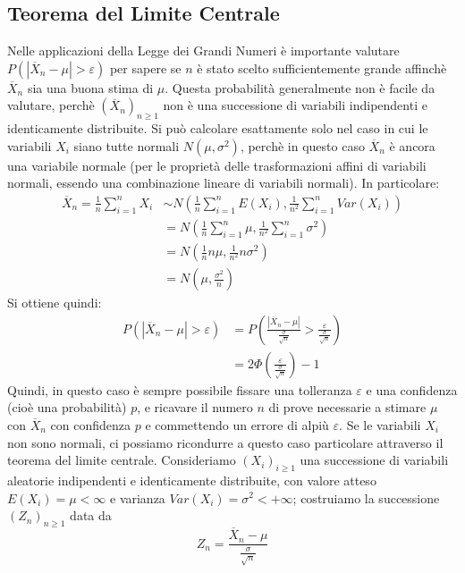 \documentclass{article}
\theoremstyle{plain}
\theoremstyle{definition}
\theoremstyle{remark}
\begin{document}
\subsection{Teorema del Limite Centrale} %
\label{sub:teorema_del_limite_centrale}
Nelle applicazioni della Legge dei Grandi Numeri è importante valutare $P(|\overline{X}_n-\mu|>\varepsilon)$ per sapere se $n$ è stato scelto sufficientemente grande affinchè $\overline{X}_n$ sia una buona stima di $\mu$. Questa probabilità generalmente non è facile da valutare, perchè $(\overline{X}_n)_{n\geq1}$ non è una successione di variabili indipendenti e identicamente distribuite. Si può calcolare esattamente solo nel caso in cui le variabili $X_i$ siano tutte normali $N(\mu,\sigma^2)$, perchè in questo caso $\overline{X}_n$ è ancora una variabile normale (per le proprietà delle trasformazioni affini di variabili normali, essendo una combinazione lineare di variabili normali). In particolare:
\begin{align*}
	\overline{X}_n=\frac{1}{n}\sum_{i=1}^nX_i&\sim N\left(\frac{1}{n}\sum_{i=1}^nE(X_i),\frac{1}{n^2}\sum_{i=1}^nVar(X_i)\right)\\
	&=N\left(\frac{1}{n}\sum_{i=1}^n\mu,\frac{1}{n^2}\sum_{i=1}^n\sigma^2\right)\\
	&=N\left(\frac{1}{n}n\mu,\frac{1}{n^2}n\sigma^2\right)\\
	&=N\left(\mu,\frac{\sigma^2}{n}\right)
\end{align*}
Si ottiene quindi:
\begin{align*}
	P(|\overline{X}_n-\mu|>\varepsilon)&=P\left(\frac{|\overline{X}_n-\mu|}{\frac{\sigma}{\sqrt{n}}}>\frac{\varepsilon}{\frac{\sigma}{\sqrt{n}}}\right)\\
	&=2\Phi\left(\frac{\varepsilon}{\frac{\sigma}{\sqrt{n}}}\right)-1
\end{align*}
Quindi, in questo caso è sempre possibile fissare una tolleranza $\varepsilon$ e una confidenza (cioè una probabilità) $p$, e ricavare il numero $n$ di prove necessarie a stimare $\mu$ con $\overline{X}_n$ con confidenza $p$ e commettendo un errore di alpiù $\varepsilon$. Se le variabili $X_i$ non sono normali, ci possiamo ricondurre a questo caso particolare attraverso il teorema del limite centrale. Consideriamo $(X_i)_{i\geq1}$ una successione di variabili aleatorie indipendenti e identicamente distribuite, con valore atteso $E(X_i)=\mu<\infty$ e varianza $Var(X_i)=\sigma^2<+\infty$; costruiamo la successione $(Z_n)_{n\geq1}$ data da
\begin{equation*}
	Z_n=\frac{\overline{X}_n-\mu}{\frac{\sigma}{\sqrt{n}}}
\end{equation*}
\end{document}
